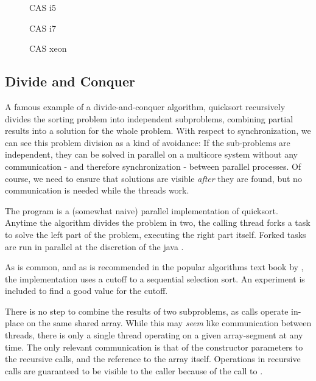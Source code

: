 \begin{figure}[hbpt]
\graphicspath{{plots/}}

\caption{CAS i5}
\label{fig:histo-cas-i5}
\end{figure}

\begin{figure}[hbpt]
\graphicspath{{plots/}}

\caption{CAS i7}
	\label{fig:histo-cas-i7}
\end{figure}

\begin{figure}[hbpt]
\graphicspath{{plots/}}

\caption{CAS xeon}
	\label{fig:histo-cas-xeon}
\end{figure}

\subsection{Divide and Conquer }
A famous example of a divide-and-conquer algorithm, quicksort recursively
divides the sorting problem into independent subproblems, combining partial
results into a solution for the whole problem. With respect to synchronization,
we can see this problem division as a kind of avoidance: If the sub-problems are
independent, they can be solved in parallel on a multicore system without any
communication - and therefore synchronization - between parallel processes.
Of course, we need to ensure that solutions are visible \textit{after} they are
found, but no communication is needed while the threads work.


The program is a (somewhat naive) parallel implementation of quicksort. Anytime
the algorithm divides the problem in two, the calling thread forks a task to
solve the left part of the problem, executing the right part itself. Forked
tasks are run in parallel at the discretion of the java .

As is common, and as is recommended in the popular algorithms text book by
\citet{sedgewick}, the implementation uses a cutoff to a sequential selection
sort. An experiment is included to find a good value for the cutoff.

There is no step to combine the results of two subproblems, as calls operate
in-place on the same shared array. While this may \textit{seem} like communication
between threads, there is only a single thread operating on a given
array-segment at any time. The only relevant communication is that of the
constructor parameters to the recursive calls, and the reference to the array
itself. Operations in
recursive calls are guaranteed to be visible to the caller because of the
call to .

